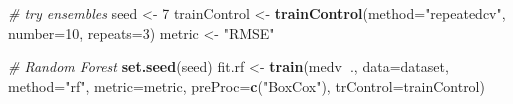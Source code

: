 \documentclass[]{book}
\newenvironment{Shaded}{\begin{snugshade}}{\end{snugshade}}
\newcommand{\CommentTok}[1]{\textcolor[rgb]{0.56,0.35,0.01}{\textit{#1}}}
\newcommand{\DataTypeTok}[1]{\textcolor[rgb]{0.13,0.29,0.53}{#1}}
\newcommand{\DecValTok}[1]{\textcolor[rgb]{0.00,0.00,0.81}{#1}}
\newcommand{\KeywordTok}[1]{\textcolor[rgb]{0.13,0.29,0.53}{\textbf{#1}}}
\newcommand{\NormalTok}[1]{#1}
\newcommand{\OperatorTok}[1]{\textcolor[rgb]{0.81,0.36,0.00}{\textbf{#1}}}
\newcommand{\StringTok}[1]{\textcolor[rgb]{0.31,0.60,0.02}{#1}}
\begin{document}
\begin{Shaded}
\begin{Highlighting}[]
\CommentTok{# try ensembles}
\NormalTok{seed <-}\StringTok{ }\DecValTok{7}
\NormalTok{trainControl <-}\StringTok{ }\KeywordTok{trainControl}\NormalTok{(}\DataTypeTok{method=}\StringTok{"repeatedcv"}\NormalTok{, }\DataTypeTok{number=}\DecValTok{10}\NormalTok{, }\DataTypeTok{repeats=}\DecValTok{3}\NormalTok{)}
\NormalTok{metric <-}\StringTok{ "RMSE"}

\CommentTok{# Random Forest}
\KeywordTok{set.seed}\NormalTok{(seed)}
\NormalTok{fit.rf <-}\StringTok{ }\KeywordTok{train}\NormalTok{(medv}\OperatorTok{~}\NormalTok{., }\DataTypeTok{data=}\NormalTok{dataset, }\DataTypeTok{method=}\StringTok{"rf"}\NormalTok{, }\DataTypeTok{metric=}\NormalTok{metric, }
                \DataTypeTok{preProc=}\KeywordTok{c}\NormalTok{(}\StringTok{"BoxCox"}\NormalTok{),}
                \DataTypeTok{trControl=}\NormalTok{trainControl)}


\end{Highlighting}
\end{Shaded}
\end{document}
